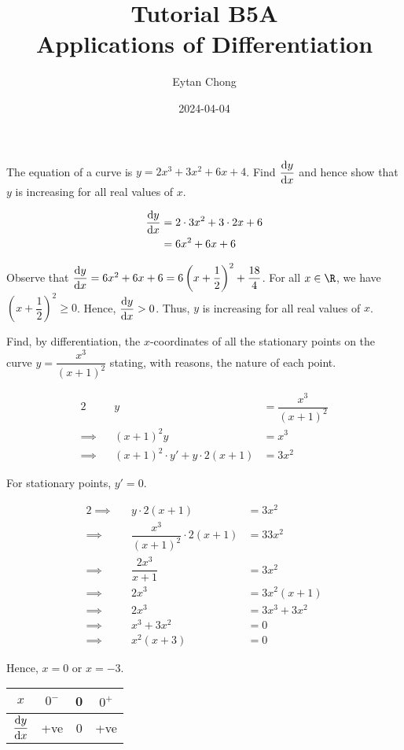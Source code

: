 \documentclass{echw}
\title{Tutorial B5A\\Applications of Differentiation}
\author{Eytan Chong}
\date{2024-04-04}
\begin{document}
    \problem{}
        The equation of a curve is $y=2x^3+3x^2+6x+4$. Find $\dfrac{\mathrm{d} y}{\mathrm{d} x}$ and hence show that $y$ is increasing for all real values of $x$.

    \solution
        \begin{align*}
            \dfrac{\mathrm{d} y}{\mathrm{d} x} &= 2\cdot3x^2 + 3 \cdot2x + 6\\
            &= 6x^2+6x+6
        \end{align*}


        Observe that $\dfrac{\mathrm{d} y}{\mathrm{d} x} = 6x^2 + 6x+6 = 6\left(x + \dfrac12\right)^2 + \dfrac{18}4$. For all $x \in \R$, we have $\left(x + \dfrac12\right)^2 \geq 0$. Hence, $\dfrac{\mathrm{d} y}{\mathrm{d} x} > 0$. Thus, $y$ is increasing for all real values of $x$.

    \problem{}
        Find, by differentiation, the $x$-coordinates of all the stationary points on the curve $y = \dfrac{x^3}{(x+1)^2}$ stating, with reasons, the nature of each point.

    \solution
        \begin{alignat*}{2}
            &&y &= \dfrac{x^3}{(x+1)^2}\\
            \implies&&(x+1)^2y&=x^3\\
            \implies&&(x+1)^2\cdot y' + y\cdot2(x+1) &= 3x^2
        \end{alignat*}

        For stationary points, $y' = 0$.

        \begin{alignat*}{2}
            \implies&&y\cdot2(x+1) &= 3x^2\\
            \implies&&\dfrac{x^3}{(x+1)^2}\cdot2(x+1) &=3 3x^2\\
            \implies&&\dfrac{2x^3}{x+1} &= 3x^2\\
            \implies&&2x^3 &= 3x^2(x+1)\\
            \implies&&2x^3 &= 3x^3 + 3x^2\\
            \implies&&x^3+3x^2&=0\\
            \implies&&x^2(x+3)&=0
        \end{alignat*}

        Hence, $x = 0$ or $x = -3$.


        \begin{table}[h]
            \centering
            \begin{tabular}{|c|c|c|c|}
            \hline
            $x$          & $0^-$ & 0 & $0^+$ \\\hline
            $\dfrac{\mathrm{d} y}{\mathrm{d} x}$ & +ve   & 0 & +ve   \\[1ex]\hline
            \end{tabular}
        \end{table}
\end{document}

